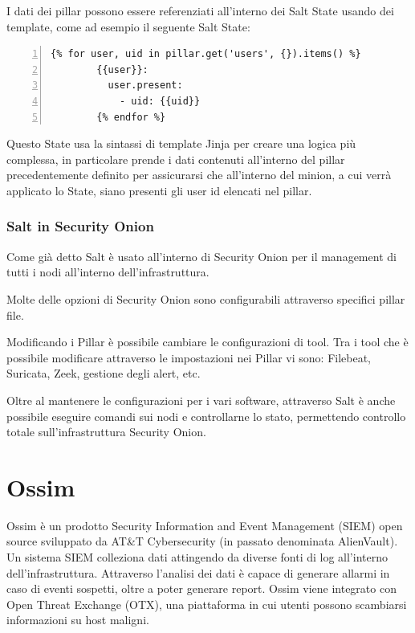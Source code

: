 I dati dei pillar possono essere referenziati all'interno dei Salt State usando dei template, come ad esempio il seguente Salt State:
    \begin{Verbatim}[numbers=left, frame=single, fontsize=\small]
        {% for user, uid in pillar.get('users', {}).items() %}
        {{user}}:
          user.present:
            - uid: {{uid}}
        {% endfor %}
    \end{Verbatim}
Questo State usa la sintassi di template Jinja per creare una logica più complessa, in particolare prende i dati contenuti all'interno del pillar precedentemente definito per assicurarsi che all'interno del minion, a cui verrà applicato lo State, siano presenti gli user id elencati nel pillar.

\subsubsection{Salt in Security Onion}
Come già detto Salt è usato all'interno di Security Onion per il management di tutti i nodi all'interno dell'infrastruttura.

Molte delle opzioni di Security Onion sono configurabili attraverso specifici pillar file.

Modificando i Pillar è possibile cambiare le configurazioni di tool. Tra i tool che è possibile modificare attraverso le impostazioni nei Pillar vi sono: Filebeat, Suricata, Zeek, gestione degli alert, etc.


Oltre al mantenere le configurazioni per i vari software, attraverso Salt è anche possibile eseguire comandi sui nodi e controllarne lo stato, permettendo controllo totale sull'infrastruttura Security Onion.


\section{Ossim}
Ossim \cite{ossim} è un prodotto Security Information and Event Management (SIEM)  open source sviluppato da AT\&T Cybersecurity (in passato denominata AlienVault). Un sistema SIEM colleziona dati attingendo da diverse fonti di log all'interno dell'infrastruttura. 
Attraverso l'analisi dei dati è capace di generare allarmi in caso di eventi sospetti, oltre a poter generare report.
Ossim viene integrato con Open Threat Exchange (OTX), una piattaforma in cui utenti possono scambiarsi informazioni su host maligni.



